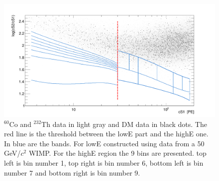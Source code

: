\begin{table}

\caption{Bins definition. The estimated background event is calculated by taking the calibration sample and scaling it by $6.54\times10^{-3}$, which is the ratio of data and calibration in a sideband. The number of data events is the number of events from the DM data set in each bin.\textcolor{blue}{I changed this table as well a bit}} \label{table:BinDef}

\end{table}


\begin{figure}[h!]
\begin{minipage}{1.\linewidth}
\centerline{\includegraphics[width=1.\linewidth]{Figures/eft_sr.png}}
\end{minipage}
\caption{$^{60}\mathrm{Co}$ and $^{232}\mathrm{Th}$ data in light gray and DM data in black dots. The red line is the threshold between the lowE part and the highE one. In blue are the bands. For lowE constructed using data from a 50 GeV/$c^2$ WIMP. For the highE region the 9 bins are presented. top left is bin number 1,  top right is bin number 6, bottom left is bin number 7 and bottom right is bin number 9.}
\label{fig:phasespace}
\end{figure}  





